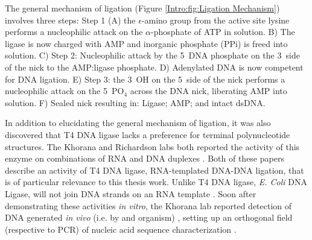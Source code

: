     The general mechanism of ligation (Figure \ref{Intro:fig:Ligation Mechanism}) involves three steps: Step 1 (A) the $\epsilon$-amino group from the active site lysine performs a nucleophilic attack on the $\alpha$-phosphate of ATP in solution. B) The ligase is now charged with AMP and inorganic phosphate (PPi) is freed into solution. C) Step 2: Nucleophilic attack by the 5\textprime~DNA phosphate on the 3\textprime~side of the nick to the AMP:ligase phosphate. D) Adenylated DNA is now competent for DNA ligation. E) Step 3: the 3\textprime~OH on the 5\textprime~side of the nick performs a nucleophilic attack on the 5\textprime~PO$_{4}$ across the DNA nick, liberating AMP into solution. F) Sealed nick resulting in: Ligase; AMP; and intact dsDNA.

    In addition to elucidating the general mechanism of ligation, it was also discovered that T4 DNA ligase lacks a preference for terminal polynucleotide structures. The Khorana and Richardson labs both reported the activity of this enzyme on combinations of RNA and DNA duplexes \citep{Fareed1971, Kleppe1970b}. Both of these papers describe an activity of T4 DNA ligase, RNA-templated DNA-DNA ligation, that is of particular relevance to this thesis work. Unlike T4 DNA ligase, \textit{E. Coli} DNA Ligase, will not join DNA strands on an RNA template \citep{Bullard2006}. Soon after demonstrating these activities \textit{in vitro}, the Khorana lab reported detection of DNA generated \textit{in vivo} (i.e. by and organism) \citep{Besmer1972b}, setting up an orthogonal field (respective to PCR) of nucleic acid sequence characterization \citep{Conze2009c}.


